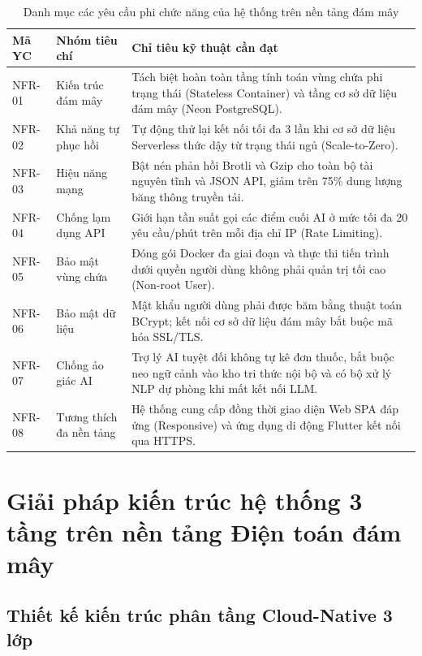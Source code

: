 \begin{table}[H]
\caption{Danh mục các yêu cầu phi chức năng của hệ thống trên nền tảng đám mây}
\label{tab:nfr_list}
\centering
\begin{tabular}{|p{1.8cm}|p{3.6cm}|p{8.6cm}|}
\hline
\textbf{Mã YC} & \textbf{Nhóm tiêu chí} & \textbf{Chỉ tiêu kỹ thuật cần đạt} \\
\hline
NFR-01 & Kiến trúc đám mây & Tách biệt hoàn toàn tầng tính toán vùng chứa phi trạng thái (Stateless Container) và tầng cơ sở dữ liệu đám mây (Neon PostgreSQL). \\
\hline
NFR-02 & Khả năng tự phục hồi & Tự động thử lại kết nối tối đa 3 lần khi cơ sở dữ liệu Serverless thức dậy từ trạng thái ngủ (Scale-to-Zero). \\
\hline
NFR-03 & Hiệu năng mạng & Bật nén phản hồi Brotli và Gzip cho toàn bộ tài nguyên tĩnh và JSON API, giảm trên 75\% dung lượng băng thông truyền tải. \\
\hline
NFR-04 & Chống lạm dụng API & Giới hạn tần suất gọi các điểm cuối AI ở mức tối đa 20 yêu cầu/phút trên mỗi địa chỉ IP (Rate Limiting). \\
\hline
NFR-05 & Bảo mật vùng chứa & Đóng gói Docker đa giai đoạn và thực thi tiến trình dưới quyền người dùng không phải quản trị tối cao (Non-root User). \\
\hline
NFR-06 & Bảo mật dữ liệu & Mật khẩu người dùng phải được băm bằng thuật toán BCrypt; kết nối cơ sở dữ liệu đám mây bắt buộc mã hóa SSL/TLS. \\
\hline
NFR-07 & Chống ảo giác AI & Trợ lý AI tuyệt đối không tự kê đơn thuốc, bắt buộc neo ngữ cảnh vào kho tri thức nội bộ và có bộ xử lý NLP dự phòng khi mất kết nối LLM. \\
\hline
NFR-08 & Tương thích đa nền tảng & Hệ thống cung cấp đồng thời giao diện Web SPA đáp ứng (Responsive) và ứng dụng di động Flutter kết nối qua HTTPS. \\
\hline
\end{tabular}
\end{table}

\section{Giải pháp kiến trúc hệ thống 3 tầng trên nền tảng Điện toán đám mây}

\subsection{Thiết kế kiến trúc phân tầng Cloud-Native 3 lớp}

